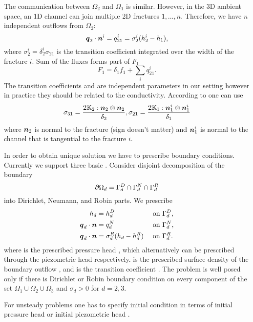 The communication between $\Omega_2$  and  $\Omega_1$ is similar.  However, in the 3D ambient space,
an 1D channel can join multiple 2D fractures $1,\dots, n$. Therefore, we have $n$
independent outflows from $\Omega_2$:
\begin{equation*}
        \mathbf{\boldsymbol{q}}_2\cdot \mathbf{\boldsymbol{n}}^{i} = q_{21}^{i} =\sigma_{2}^{i} (h_2^{i}-h_1),
\end{equation*}
where $\sigma_2^{i}=\delta_2^{i}\sigma_{21}$  is the transition coefficient integrated over 
the width of the fracture $i$. Sum of the fluxes forms part of $F_1$ 
\begin{equation}
   \label{source_1D}
   F_1 = \delta_1 f_1 + \sum_{i} q_{21}^{i}. 
\end{equation}
The transition coefficients 
  and
  are independent parameters in our setting however in practice
they should be related to the conductivity. According to 
\cite{martin_modeling_2005} one can use
\[
\label{e:sigma_law}
  \sigma_{31} = \frac{2\tn K_2 :\vc n_2\otimes\vc n_2 }{\delta_2}, \sigma_{21} = \frac{2\tn K_1:{\vc n_1^i}\otimes{\vc n_1^i}}{\delta_1}
\]
where $\mathbf{\boldsymbol{n}}_2$ is normal to the fracture (sign doesn't matter) and $\mathbf{\boldsymbol{n}}_1^i$ is normal to the channel that is tangential to the fracture $i$.

In order to obtain unique solution we have to prescribe boundary conditions. Currently we support three basic 
. 
Consider disjoint decomposition of the boundary
\[
    \partial\Omega_d = \Gamma_d^D \cap \Gamma_d^N \cap \Gamma_d^R
\]
into Dirichlet, Neumann, and Robin parts. We prescribe
\begin{align}
    h_d &= h_d^D        &&\text{ on }\Gamma_d^D,\\
    \mathbf{\boldsymbol{q}}_d \cdot \mathbf{\boldsymbol{n}} &= q_d^N         &&\text{ on }\Gamma_d^N,\\
    \mathbf{\boldsymbol{q}}_d \cdot \mathbf{\boldsymbol{n}} &= \sigma_d^R ( h_d - h_d^R)     &&\text{ on }\Gamma_d^R.
\end{align}
where 
is the prescribed pressure head , which alternatively can be prescribed through the piezometric head 
respectively. 
is the prescribed surface density of the boundary outflow , and  
is the transition coefficient .
The problem is well posed only if there is Dirichlet or Robin boundary condition on every component of the set $\Omega_1 \cup \Omega_2 \cup \Omega_3$ and $\sigma_d >0$ for 
$d=2,3$.

For unsteady problems one has to specify initial condition in terms of initial pressure head 
or initial piezometric head 
.




